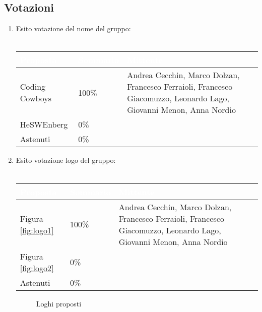\documentclass[12pt]{article}
\begin{document}
\subsection{Votazioni} \label{subsec:resvotazione}
\begin{enumerate}
    \item Esito votazione del nome del gruppo: \\\\
        \begingroup
            \setlength{\tabcolsep}{10pt}
            \renewcommand{\arraystretch}{1.5}
            \begin{tabularx}{0.93\textwidth}{| l | l | X |}
                 \hline
                 \rowcolor{headerrow}\textbf{\textcolor{white}{Proposta}} & \textbf{\textcolor{white}{Sommario}} & \textbf{\textcolor{white}{Mittente}} \\
                 \hline
                 Coding Cowboys & 100\%  & Andrea Cecchin, Marco Dolzan, Francesco Ferraioli, Francesco Giacomuzzo, Leonardo Lago, Giovanni Menon, Anna Nordio \\
                 \hline
                 HeSWEnberg & 0\% & \\
                 \hline
                 Astenuti & 0\% & \\
                 \hline
            \end{tabularx}
        \endgroup
    \item Esito votazione logo del gruppo: \\\\
        \begingroup
            \setlength{\tabcolsep}{10pt}
            \renewcommand{\arraystretch}{1.5}
            \begin{tabularx}{0.93\textwidth}{| l | l | X |}
                 \hline
                 \rowcolor{headerrow}\textbf{\textcolor{white}{Proposta}} & \textbf{\textcolor{white}{Sommario}} & \textbf{\textcolor{white}{Mittente}} \\
                 \hline
                 Figura \ref{fig:logo1} & 100\%  & Andrea Cecchin, Marco Dolzan, Francesco Ferraioli, Francesco Giacomuzzo, Leonardo Lago, Giovanni Menon, Anna Nordio \\
                 \hline
                 Figura \ref{fig:logo2} & 0\% & \\
                 \hline
                 Astenuti & 0\% & \\
                 \hline
            \end{tabularx}
        \endgroup
        \begin{figure}
            \centering
             \quad
             \quad
            \caption{Loghi proposti}
            \label{fig:loghi}
        \end{figure}
\end{enumerate}
\end{document}
